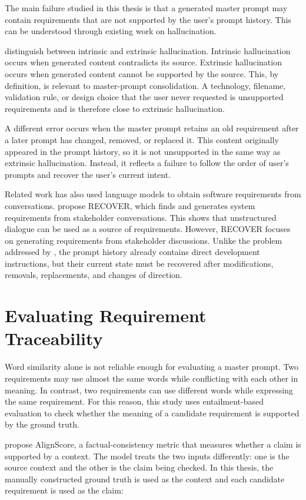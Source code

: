 The main failure studied in this thesis is that a generated master prompt may
contain requirements that are not supported by the user's prompt history.
This can be understood through existing work on hallucination.

\citet{ji2023survey} distinguish between intrinsic and extrinsic
hallucination. Intrinsic hallucination occurs when generated content
contradicts its source. Extrinsic hallucination occurs when generated content
cannot be supported by the source. This, by definition, is relevant to master-prompt
consolidation. A technology, filename, validation rule, or design choice that
the user never requested is unsupported requirements and is therefore close to
extrinsic hallucination. 

A different error occurs when the master prompt retains an old requirement
after a later prompt has changed, removed, or replaced it. This content
originally appeared in the prompt history, so it is not unsupported in the
same way as extrinsic hallucination. Instead, it reflects a failure to 
follow the order of user's prompts and recover the user's current intent.

Related work has also used language models to obtain software requirements
from conversations. \citet{voria2025recover} propose RECOVER, which finds
and generates system requirements from stakeholder conversations. This shows
that unstructured dialogue can be used as a source of requirements. However,
RECOVER focuses on generating requirements from stakeholder discussions. Unlike 
the problem addressed by \citet{voria2025recover}, the prompt history already
contains direct development instructions, but their current state must be 
recovered after modifications, removals, replacements, and changes of direction.

\section{Evaluating Requirement Traceability}
\label{sec:related-metrics}

Word similarity alone is not reliable enough for evaluating a master prompt. Two
requirements may use almost the same words while conflicting with each other in meaning.
In contrast, two requirements can use different words while expressing the same
requirement. For this reason, this study uses entailment-based evaluation to check whether the meaning of a candidate requirement is supported by the ground truth.

\citet{zha2023alignscore} propose AlignScore, a factual-consistency metric that
measures whether a claim is supported by a context. The model treats the two
inputs differently: one is the source context and the other is the claim being
checked. In this thesis, the manually constructed ground truth is used as the
context and each candidate requirement is used as the claim:

